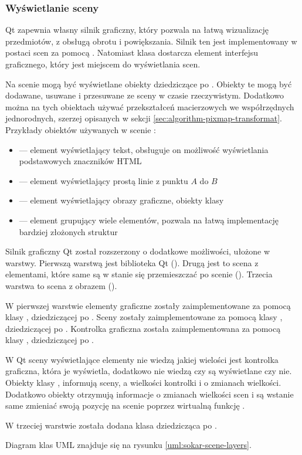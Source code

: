 \subsubsection{Wyświetlanie sceny}
\par
Qt zapewnia własny silnik graficzny, który pozwala na łatwą wizualizację przedmiotów, z obsługą obrotu i powiększania.
Silnik ten jest implementowany w postaci scen za pomocą .
Natomiast klasa  dostarcza element interfejsu graficznego, który jest miejscem do wyświetlania scen.
\par
Na scenie mogą być wyświetlane obiekty dziedziczące po .
Obiekty te mogą być dodawane, usuwane i przesuwane ze sceny w czasie rzeczywistym.
Dodatkowo można na tych obiektach używać przekształceń macierzowych we współrzędnych jednorodnych, szerzej opisanych w sekcji \ref{sec:algorithm-pixmap-transformat}.
Przykłady obiektów używanych w scenie :
\begin{itemize}
    \item {} --- element wyświetlający tekst, obsługuje on możliwość wyświetlania podstawowych znaczników HTML
    \item {} --- element wyświetlający prostą linie z punktu $A$ do $B$
    \item {} --- element wyświetlający obrazy graficzne, obiekty klasy 
    \item {} --- element grupujący wiele elementów, pozwala na łatwą implementację bardziej złożonych struktur
\end{itemize}
\par
Silnik graficzny Qt został rozszerzony o dodatkowe możliwości, ułożone w warstwy.
Pierwszą warstwą jest biblioteka Qt ().
Drugą jest to scena z elementami, które same są w stanie się przemieszczać po scenie ().
Trzecia warstwa to scena z obrazem \DICOM ().
\par
W pierwszej warstwie elementy graficzne zostały zaimplementowane za pomocą klasy , dziedziczącej po .
Sceny zostały zaimplementowane za pomocą klasy , dziedziczącej po .
Kontrolka graficzna została zaimplementowana za pomocą klasy , dziedziczącej po . 
\par
W Qt sceny wyświetlające elementy nie wiedzą jakiej wielości jest kontrolka graficzna, która je wyświetla, dodatkowo nie wiedzą czy są wyświetlane czy nie.
Obiekty klasy , informują sceny, a wielkości kontrolki i o zmianach wielkości.
Dodatkowo obiekty  otrzymują informacje o zmianach wielkości scen i są wstanie same zmieniać swoją pozycję na scenie poprzez wirtualną funkcję .
\par
W trzeciej warstwie została dodana klasa  dziedzicząca po .
\par
Diagram klas UML znajduje się na rysunku \ref{uml:sokar-scene-layers}.

